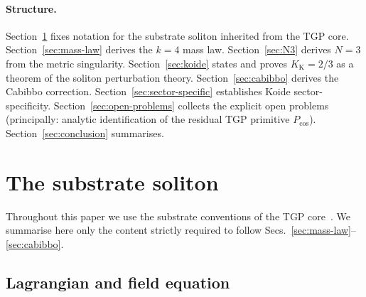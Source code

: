 \documentclass[11pt,a4paper]{article}
\newcommand{\Kkoide}{K_{\mathrm{K}}}
\newcommand{\Pcos}{P_{\cos}}
\begin{document}
\paragraph{Structure.} Section~\ref{sec:soliton} fixes notation for the
substrate soliton inherited from the TGP core. Section~\ref{sec:mass-law}
derives the $k=4$ mass law. Section~\ref{sec:N3} derives
$N=3$ from the metric singularity. Section~\ref{sec:koide} states and
proves $\Kkoide=2/3$ as a theorem of the soliton perturbation theory.
Section~\ref{sec:cabibbo} derives the Cabibbo correction.
Section~\ref{sec:sector-specific} establishes Koide sector-specificity.
Section~\ref{sec:open-problems} collects the explicit open problems
(principally: analytic identification of the residual TGP primitive
$\Pcos$). Section~\ref{sec:conclusion} summarises.

\section{The substrate soliton}\label{sec:soliton}

Throughout this paper we use the substrate conventions of the TGP
core~\cite{TGP-core}. We summarise here only the content strictly
required to follow Secs.~\ref{sec:mass-law}--\ref{sec:cabibbo}.

\subsection{Lagrangian and field equation}
\end{document}
